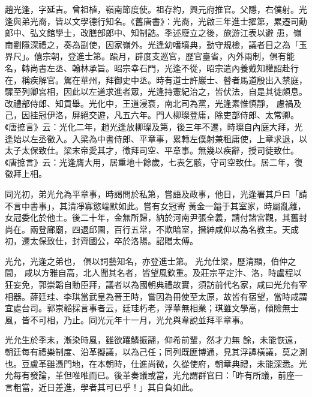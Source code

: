 
\begin{pinyinscope}

 趙光逢，字延吉。曾祖植，嶺南節度使。祖存約，興元府推官。父隱，右僕射。光逢與弟光裔，皆以文學德行知名。《舊唐書》：光裔，光啟三年進士擢第，累遷司勳郎中、弘文館學士，改膳部郎中、知制誥。季述廢立之後，旅游江表以避
 患，嶺南劉隱深禮之，奏為副使，因家嶺外。光逢幼嗜墳典，動守規檢，議者目之為「玉界尺」。僖宗朝，登進士第。踰月，辟度支巡官，歷官臺省，內外兩制，俱有能名，轉尚書左丞、翰林承旨。昭宗幸石門，光逢不從，昭宗遣內養戴知權詔赴行在，稱疾解官。駕在華州，拜御史中丞。時有道士許巖士、瞽者馬道殷出入禁庭，驟至列卿宮相，因此以左道求進者眾，光逢持憲紀治之，皆伏法，自是其徒頗息。改禮部侍郎、知貢舉。光化中，王道浸衰，南北司為黨，光逢素惟慎靜，
 慮禍及己，因挂冠伊洛，屏絕交遊，凡五六年。門人柳璨登庸，除吏部侍郎、太常卿。《唐摭言》云：光化二年，趙光逢放柳璨及第，後三年不遷，時璨自內庭大拜，光逢始以左丞徵入。入梁為中書侍郎、平章事，累轉左僕射兼租庸使，上章求退，以太子太保致仕。梁末帝愛其才，徵拜司空、平章事。無幾以疾辭，授司徒致仕。《唐摭言》云：光逢膺大用，居重地十餘歲，七表乞骸，守司空致仕。居二年，復徵拜上相。



 同光初，弟光允為平章事，時謁問於私第，嘗語及政事，他日，光逢署其戶曰「請不言中書事」，其清凈寡慾端默如此。嘗有女冠寄
 黃金一鎰于其室家，時屬亂離，女冠委化於他土。後二十年，金無所歸，納於河南尹張全義，請付諸宮觀，其舊封尚在。兩登廊廟，四退邱園，百行五常，不欺暗室，搢紳咸仰以為名教主。天成初，遷太保致仕，封齊國公，卒於洛陽。詔贈太傅。


光允，光逢之弟也，
 俱以詞藝知名，亦登進士第。
 光允仕梁，歷清顯，伯仲之間，
 咸以方雅自高，北人聞其名者，皆望風欽重。及莊宗平定汴、洛，時盧程以狂妄免，郭崇韜自勳臣拜，議者以為國朝典禮故實，須訪前代名家，咸曰光允有宰相器。薛廷珪、李琪當武皇為晉王時，嘗因為冊使至太原，故皆有宿望，當時咸謂宜處台司。郭崇韜採言事者云，廷珪朽老，浮華無相業；琪雖文學高，傾險無士風，皆不可相，乃止。同光元年十一月，光允與韋說並拜平章事。



 光允生於季末，漸染時風，雖欲躍鱗振翮，仰希前輩，然才力無
 餘，未能恢遠，朝廷每有禮樂制度、沿革擬議，以為己任；同列既匪博通，見其浮譚橫議，莫之測也。豆盧革雖憑門地，在本朝時，仕進尚微，久從使府，朝章典禮，未能深悉。光允每有發論，革但唯唯而已。後革奏議或當，光允謂群官曰：「昨有所議，前座一言粗當，近日差進，學者其可已乎！」其自負如此。




\end{pinyinscope}
